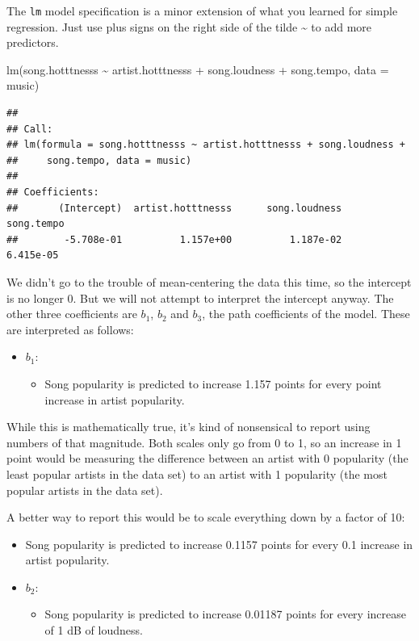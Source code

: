 \documentclass[
]{book}
\newenvironment{Shaded}{\begin{snugshade}}{\end{snugshade}}
\newcommand{\AttributeTok}[1]{\textcolor[rgb]{0.77,0.63,0.00}{#1}}
\newcommand{\FunctionTok}[1]{\textcolor[rgb]{0.00,0.00,0.00}{#1}}
\newcommand{\NormalTok}[1]{#1}
\newcommand{\SpecialCharTok}[1]{\textcolor[rgb]{0.00,0.00,0.00}{#1}}
\providecommand{\tightlist}{%
  \setlength{\itemsep}{0pt}\setlength{\parskip}{0pt}}
\begin{document}
The \texttt{lm} model specification is a minor extension of what you learned for simple regression. Just use plus signs on the right side of the tilde \textasciitilde{} to add more predictors.

\begin{Shaded}
\begin{Highlighting}[]
\FunctionTok{lm}\NormalTok{(song.hotttnesss }\SpecialCharTok{\textasciitilde{}}\NormalTok{ artist.hotttnesss }\SpecialCharTok{+}\NormalTok{ song.loudness }\SpecialCharTok{+} 
\NormalTok{       song.tempo,}
   \AttributeTok{data =}\NormalTok{ music)}
\end{Highlighting}
\end{Shaded}

\begin{verbatim}
## 
## Call:
## lm(formula = song.hotttnesss ~ artist.hotttnesss + song.loudness + 
##     song.tempo, data = music)
## 
## Coefficients:
##       (Intercept)  artist.hotttnesss      song.loudness         song.tempo  
##        -5.708e-01          1.157e+00          1.187e-02          6.415e-05
\end{verbatim}

We didn't go to the trouble of mean-centering the data this time, so the intercept is no longer 0. But we will not attempt to interpret the intercept anyway. The other three coefficients are \(b_{1}\), \(b_{2}\) and \(b_{3}\), the path coefficients of the model. These are interpreted as follows:

\begin{itemize}
\tightlist
\item
  \(b_{1}\):

  \begin{itemize}
  \tightlist
  \item
    Song popularity is predicted to increase 1.157 points for every point increase in artist popularity.
  \end{itemize}
\end{itemize}

While this is mathematically true, it's kind of nonsensical to report using numbers of that magnitude. Both scales only go from 0 to 1, so an increase in 1 point would be measuring the difference between an artist with 0 popularity (the least popular artists in the data set) to an artist with 1 popularity (the most popular artists in the data set).

A better way to report this would be to scale everything down by a factor of 10:

\begin{itemize}
\item
  Song popularity is predicted to increase 0.1157 points for every 0.1 increase in artist popularity.
\item
  \(b_{2}\):

  \begin{itemize}
  \tightlist
  \item
    Song popularity is predicted to increase 0.01187 points for every increase of 1 dB of loudness.
  \end{itemize}
\end{itemize}
\end{document}

